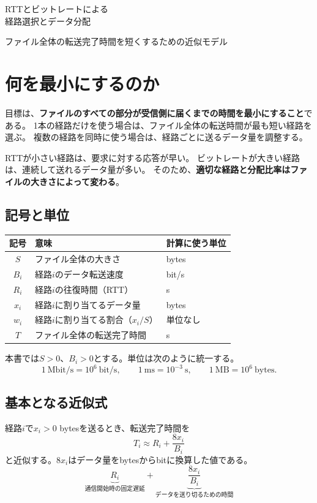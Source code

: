 \documentclass[a4paper,11pt]{article}
\begin{document}
\begin{center}
  {\LARGE\sffamily RTTとビットレートによる\\[4pt]経路選択とデータ分配}\par
  \vspace{5pt}
  {\large ファイル全体の転送完了時間を短くするための近似モデル}
\end{center}

\section{何を最小にするのか}

目標は、\textbf{ファイルのすべての部分が受信側に届くまでの時間を最小にすること}である。
1本の経路だけを使う場合は、ファイル全体の転送時間が最も短い経路を選ぶ。
複数の経路を同時に使う場合は、経路ごとに送るデータ量を調整する。

RTTが小さい経路は、要求に対する応答が早い。
ビットレートが大きい経路は、連続して送れるデータ量が多い。
そのため、\textbf{適切な経路と分配比率はファイルの大きさによって変わる}。

\subsection{記号と単位}
\begin{center}
\begin{tabular}{@{}cll@{}}
\toprule
記号 & 意味 & 計算に使う単位 \\
\midrule
$S$ & ファイル全体の大きさ & bytes \\
$B_i$ & 経路$i$のデータ転送速度 & bit/s \\
$R_i$ & 経路$i$の往復時間（RTT） & s \\
$x_i$ & 経路$i$に割り当てるデータ量 & bytes \\
$w_i$ & 経路$i$に割り当てる割合（$x_i/S$） & 単位なし \\
$T$ & ファイル全体の転送完了時間 & s \\
\bottomrule
\end{tabular}
\end{center}

本書では$S>0$、$B_i>0$とする。単位は次のように統一する。
\[
  1\ \mathrm{Mbit/s}=10^6\ \mathrm{bit/s},\qquad
  1\ \mathrm{ms}=10^{-3}\ \mathrm{s},\qquad
  1\ \mathrm{MB}=10^6\ \mathrm{bytes}.
\]

\subsection{基本となる近似式}
経路$i$で$x_i>0$ bytesを送るとき、転送完了時間を
\begin{equation}
  \boxed{T_i\approx R_i+\frac{8x_i}{B_i}}
  \label{eq:base}
\end{equation}
と近似する。$8x_i$はデータ量をbytesからbitに換算した値である。
\[
  \underbrace{R_i}_{\text{通信開始時の固定遅延}}
  +\underbrace{\frac{8x_i}{B_i}}_{\text{データを送り切るための時間}}
\]
\end{document}
